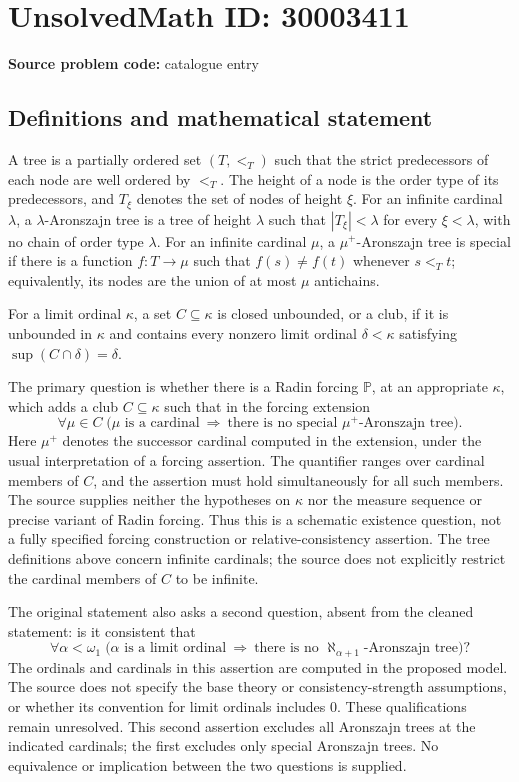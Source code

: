 \documentclass[11pt]{article}
\begin{document}
\section*{UnsolvedMath ID: 30003411}
\textbf{Source problem code:} catalogue entry
\subsection{Definitions and mathematical statement}
A tree is a partially ordered set \((T,<_{T})\) such that the strict predecessors of each node are well ordered by \(<_{T}\). The height of a node is the order type of its predecessors, and \(T_{\xi}\) denotes the set of nodes of height \(\xi\). For an infinite cardinal \(\lambda\), a \(\lambda\)-Aronszajn tree is a tree of height \(\lambda\) such that \(|T_{\xi}|<\lambda\) for every \(\xi<\lambda\), with no chain of order type \(\lambda\). For an infinite cardinal \(\mu\), a \(\mu^{+}\)-Aronszajn tree is special if there is a function \(f:T\to\mu\) such that \(f(s)\ne f(t)\) whenever \(s<_{T}t\); equivalently, its nodes are the union of at most \(\mu\) antichains.

For a limit ordinal \(\kappa\), a set \(C\subseteq\kappa\) is closed unbounded, or a club, if it is unbounded in \(\kappa\) and contains every nonzero limit ordinal \(\delta<\kappa\) satisfying \(\sup(C\cap\delta)=\delta\).

The primary question is whether there is a Radin forcing \(\mathbb P\), at an appropriate \(\kappa\), which adds a club \(C\subseteq\kappa\) such that in the forcing extension
\[
\forall\mu\in C\;\bigl(\mu\text{ is a cardinal}\ \Longrightarrow\ \text{there is no special }\mu^{+}\text{-Aronszajn tree}\bigr).
\]
Here \(\mu^{+}\) denotes the successor cardinal computed in the extension, under the usual interpretation of a forcing assertion. The quantifier ranges over cardinal members of \(C\), and the assertion must hold simultaneously for all such members. The source supplies neither the hypotheses on \(\kappa\) nor the measure sequence or precise variant of Radin forcing. Thus this is a schematic existence question, not a fully specified forcing construction or relative-consistency assertion. The tree definitions above concern infinite cardinals; the source does not explicitly restrict the cardinal members of \(C\) to be infinite.

The original statement also asks a second question, absent from the cleaned statement: is it consistent that
\[
\forall\alpha<\omega_{1}\;\bigl(\alpha\text{ is a limit ordinal}\ \Longrightarrow\ \text{there is no }\aleph_{\alpha+1}\text{-Aronszajn tree}\bigr)?
\]
The ordinals and cardinals in this assertion are computed in the proposed model. The source does not specify the base theory or consistency-strength assumptions, or whether its convention for limit ordinals includes \(0\). These qualifications remain unresolved. This second assertion excludes all Aronszajn trees at the indicated cardinals; the first excludes only special Aronszajn trees. No equivalence or implication between the two questions is supplied.
\end{document}
